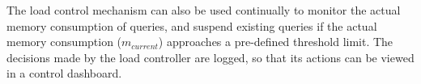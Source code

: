 The load control mechanism can also be used continually to monitor the actual memory consumption of queries, and suspend existing queries if the actual memory consumption ($m_{current}$) approaches a pre-defined threshold limit.
The decisions made by the load controller are logged, so that its actions can be viewed in a control dashboard.

